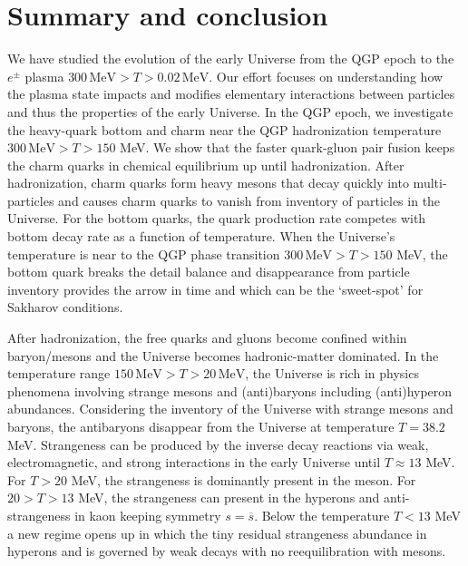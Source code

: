 \chapter{Summary and conclusion}\label{Summary}
We have studied the evolution of the early Universe from the QGP epoch to the $e^\pm$ plasma $300\,\mathrm{MeV}>T>0.02\,\mathrm{MeV}$. Our effort focuses on understanding how the plasma state impacts and modifies elementary interactions between particles and thus the properties of the early Universe.
In the QGP epoch, 
we investigate the heavy-quark bottom and charm near the QGP hadronization temperature $300\,\mathrm{MeV}>T>150$ MeV. We show that the  faster quark-gluon pair fusion keeps the charm quarks in chemical equilibrium up until hadronization. After hadronization, charm quarks form heavy mesons that decay quickly into multi-particles and causes charm quarks to vanish from inventory of particles in the Universe. For the bottom quarks, the
quark production rate competes with bottom decay rate as a function of temperature. When the Universe's temperature is near to the QGP phase transition $300\,\mathrm{MeV}>T>150$ MeV, the bottom quark breaks the detail balance and disappearance from particle inventory provides the arrow in time and which can be the ‘sweet-spot’ for Sakharov conditions.

After hadronization, the free quarks and gluons become confined within baryon/mesons and the Universe becomes hadronic-matter dominated. In the temperature range $ 150\,\mathrm{MeV}>T>20\,\mathrm{MeV}$, the Universe is rich in physics phenomena involving strange mesons and (anti)baryons including (anti)hyperon abundances. 
Considering the inventory of the Universe  with strange mesons and baryons, the antibaryons disappear from the Universe at temperature $T=38.2$ MeV. Strangeness can be produced by the inverse decay reactions via weak, electromagnetic, and strong interactions in the early Universe until $T\approx13$ MeV. For $T>20$ MeV, the strangeness is dominantly present in the meson. For $20 >T > 13$ MeV, the strangeness can present in the hyperons and anti-strangeness in kaon keeping symmetry $s=\overline{s}$. Below the temperature $T<13$ MeV a new regime opens up in which the tiny residual strangeness abundance in hyperons and is governed by weak decays with no reequilibration with mesons.


